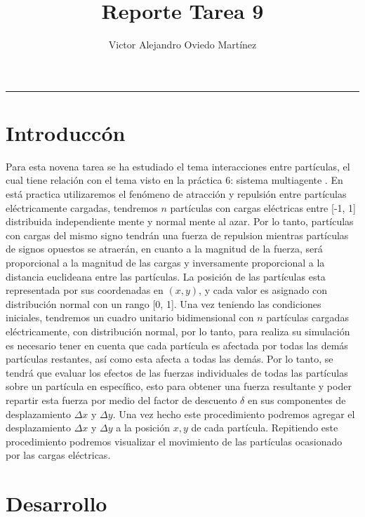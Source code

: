 \documentclass{article}
\title{Reporte Tarea 9}
\author{Victor Alejandro Oviedo Martínez}
\begin{document}
\maketitle
\hrule

\section{Introduccón}\label{intro}
Para esta novena tarea \citep{DRA.P9} se ha estudiado el tema interacciones entre partículas, el cual tiene relación con el tema visto en la práctica 6: sistema multiagente \citep{DRA.P6}. En está practica utilizaremos el fenómeno de atracción y repulsión entre partículas eléctricamente cargadas, tendremos $n$ partículas con cargas eléctricas  entre [-1, 1] distribuida independiente mente y normal mente al azar. Por lo tanto, partículas con cargas del mismo signo tendrán una fuerza de repulsion mientras partículas de signos opuestos se atraerán, en cuanto a la magnitud de la fuerza, será proporcional a la magnitud de las cargas y inversamente proporcional a la distancia euclideana entre las partículas. La posición de las partículas esta representada por sus coordenadas en $(x, y)$, y cada valor es asignado con distribución normal con un rango [0, 1]. Una vez teniendo las condiciones iniciales, tendremos un cuadro unitario bidimensional con $n$ partículas cargadas eléctricamente, con distribución normal, por lo tanto, para realiza su simulación es necesario tener en cuenta que cada partícula es afectada por todas las demás partículas restantes, así como esta afecta a todas las demás. Por lo tanto, se tendrá que evaluar los efectos de las fuerzas individuales de todas las partículas sobre un partícula en específico, esto para obtener una fuerza resultante y poder repartir esta fuerza por medio del factor de descuento $\delta$ en sus componentes de desplazamiento $\Delta{x}$ y $\Delta{y}$. Una vez hecho este procedimiento podremos agregar el desplazamiento $\Delta{x}$ y $\Delta{y}$ a la posición $x, y$ de cada partícula. Repitiendo este procedimiento podremos visualizar el movimiento de las partículas ocasionado por las cargas eléctricas.\\






 

\section{Desarrollo}
\end{document}
